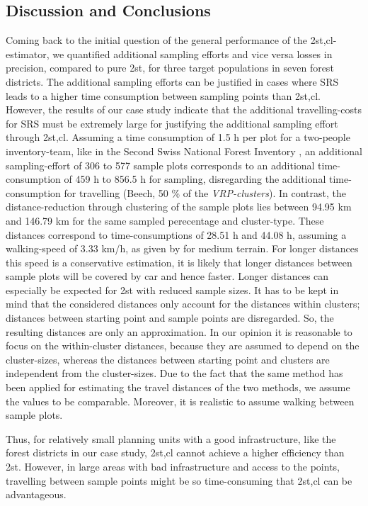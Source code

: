 \subsection{Discussion and Conclusions}
Coming back to the initial question of the general performance of the 2st,cl-estimator, we quantified additional sampling efforts and vice versa losses in precision, compared to pure 2st, for three target populations in seven forest districts. The additional sampling efforts can be justified in cases where SRS leads to a higher time consumption between sampling points than 2st,cl. However, the results of our case study indicate that the additional travelling-costs for SRS must be extremely large for justifying the additional sampling effort through 2st,cl. Assuming a time consumption of 1.5 h per plot for a two-people inventory-team, like in the Second Swiss National Forest Inventory \citep{Zinggeler_1997,Zinggeler_2001}, an additional sampling-effort of 306 to 577 sample plots corresponds to an additional time-consumption of 459 h to 856.5 h for sampling, disregarding the additional time-consumption for travelling (Beech, 50 \% of the \textit{VRP-clusters}). In contrast, the distance-reduction through 
clustering of the sample plots lies between 94.95 km and 146.79 km for the same sampled perecentage 
and cluster-type. These distances correspond to time-consumptions of 28.51 h and 44.08 h, assuming a walking-speed of 3.33 km/h, as given by \citet{Scott_1993} for medium terrain. For longer distances this speed is a conservative estimation, it is likely that longer distances between sample plots will be covered by car and hence faster. Longer distances can especially be expected for 2st with reduced sample sizes. It has to be kept in mind that the considered distances only account for the distances within clusters; distances between starting point and sample points are disregarded. So, the resulting distances are only an approximation. In our opinion it is reasonable to focus on the within-cluster distances, because they are assumed to depend on the cluster-sizes, whereas the distances between starting point and clusters are independent from the cluster-sizes. Due to the fact that the same method has been applied for estimating the travel distances of the two methods, we assume the values to be comparable. 
Moreover, it is realistic to assume walking between sample plots.

Thus, for relatively small planning units with a good infrastructure, like the forest districts in our case study, 2st,cl cannot achieve a higher efficiency than 2st. However, in large areas with bad infrastructure and access to the points, travelling between sample points might be so time-consuming that 2st,cl can be advantageous.

